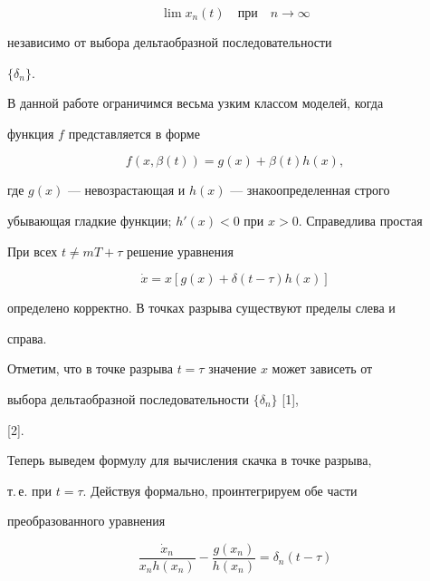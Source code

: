 $$


\lim x_n(t)\quad\text{при}\quad n\to\infty


$$


независимо от выбора дельтаобразной последовательности 


$\{\delta_n\}$.





В данной работе ограничимся весьма узким классом моделей, когда 


функция $f$ представляется в форме


$$


f(x,\beta(t))=g(x)+\beta(t)h(x),


$$


где $g(x)$ --- невозрастающая и $h(x)$ --- знакоопределенная строго 


убывающая гладкие функции; $h'(x) < 0$ при $x>0$. Справедлива простая





\begin{lems}%


При всех $t\ne mT+\tau$ решение уравнения


\begin{equation}


\Dot x=x[g(x)+\delta(t-\tau)h(x)]


\label{1.2}


\end{equation}


определено корректно. В точках разрыва существуют пределы слева и 


справа.


\end{lems}





Отметим, что в точке разрыва $t=\tau$ значение $x$ может зависеть от 


выбора дельтаобразной последовательности $\{\delta_n\}$ [1], 


[2].





Теперь выведем формулу для вычисления скачка в точке разрыва,


т.\,е. при $t=\tau$. Действуя формально, проинтегрируем обе части


преобразованного уравнения 


\begin{equation}


\frac{\Dot x_n}{x_nh(x_n)}-\frac{g(x_n)}{h(x_n)}=\delta_n(t-\tau)


\label{1.3}


\end{equation}


